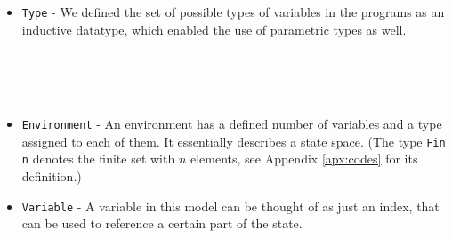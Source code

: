 \begin{itemize}
    \item \verb|Type| - We defined the set of possible types of variables in the programs as an inductive datatype, which enabled the use of parametric types as well.
    \begin{code}
        \>[0]\AgdaSpace{}%
        \AgdaSpace{}%
        \<%
        \\
        \>[0][@{}l@{\AgdaIndent{0}}]%
        \>[2]\AgdaSpace{}%
        \AgdaSymbol{:}\AgdaSpace{}%
        \<%
        \\
        \>[2]\AgdaSpace{}%
        \AgdaSymbol{:}\AgdaSpace{}%
        \AgdaSpace{}%
        \AgdaSpace{}%
        \<%
        \\
        \>[2]\AgdaSpace{}%
        \AgdaSymbol{:}\AgdaSpace{}%
        \AgdaSpace{}%
        \AgdaSpace{}%
        \<%
    \end{code}
    
    \item \verb|Environment| - An environment has a defined number of variables and a type assigned to each of them. It essentially describes a state space. (The type \verb|Fin n| denotes the finite set with $n$ elements, see Appendix \ref{apx:codes} for its definition.)
    \begin{code}
        \>[0]\AgdaSpace{}%
        \AgdaSpace{}%
        \AgdaSymbol{(}\AgdaSpace{}%
        \AgdaSymbol{:}\AgdaSpace{}%
        \AgdaSymbol{)}\AgdaSpace{}%
        \AgdaSymbol{(}\AgdaSpace{}%
        \AgdaSymbol{:}\AgdaSpace{}%
        \AgdaSpace{}%
        \AgdaSpace{}%
        \AgdaSpace{}%
        \AgdaSymbol{)}\AgdaSpace{}%
        \<%
    \end{code}
    
    \item \verb|Variable| - A variable in this model can be thought of as just an index, that can be used to reference a certain part of the state.
    \begin{code}
        \>[2]\AgdaSpace{}%
        \AgdaSymbol{:}\AgdaSpace{}%
        \<%
        \\
        \>[2]\AgdaSpace{}%
        \AgdaSymbol{=}\AgdaSpace{}%
        \AgdaSpace{}%
        \<%
    \end{code}
    

\end{itemize}
